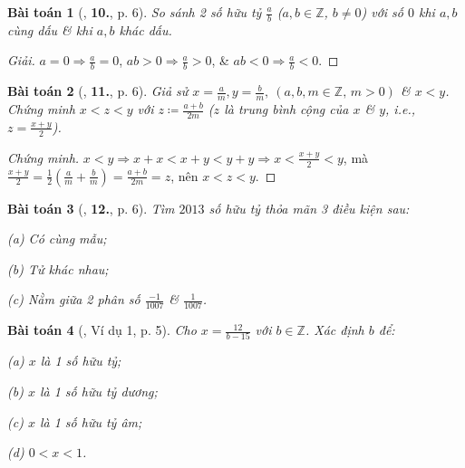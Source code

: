 \documentclass{article}
\numberwithin{equation}{section}
\newtheorem{baitoan}{Bài toán}[section]
\begin{document}
\begin{baitoan}[\cite{Trong_Toan_7_2022}, \textbf{10.}, p. 6]
	So sánh 2 số hữu tỷ $\frac{a}{b}$ ($a,b\in\mathbb{Z}$, $b\ne 0$) với số $0$ khi $a,b$ cùng dấu \& khi $a,b$ khác dấu.
\end{baitoan}

\begin{proof}[Giải]
	$a = 0\Rightarrow\frac{a}{b} = 0$, $ab > 0\Rightarrow\frac{a}{b} > 0$, \& $ab < 0\Rightarrow\frac{a}{b} < 0$.
\end{proof}

\begin{baitoan}[\cite{Trong_Toan_7_2022}, \textbf{11.}, p. 6]
	Giả sử $x = \frac{a}{m},y = \frac{b}{m},\ (a,b,m\in\mathbb{Z},\,m > 0)$ \& $x < y$. Chứng minh $x < z < y$ với $z\coloneqq\frac{a + b}{2m}$ ($z$ là \emph{trung bình cộng} của $x$ \& $y$, i.e., $z = \frac{x + y}{2}$).
\end{baitoan}

\begin{proof}[Chứng minh]
	$x < y\Rightarrow x + x < x + y < y + y\Rightarrow x < \frac{x + y}{2} < y$, mà $\frac{x + y}{2} = \frac{1}{2}\left(\frac{a}{m} + \frac{b}{m}\right) = \frac{a + b}{2m} = z$, nên $x < z < y$.
\end{proof}

\begin{baitoan}[\cite{Trong_Toan_7_2022}, \textbf{12.}, p. 6]
	Tìm $2013$ số hữu tỷ thỏa mãn 3 điều kiện sau:
	\begin{enumerate*}
		\item[(a)] Có cùng mẫu;
		\item[(b)] Tử khác nhau;
		\item[(c)] Nằm giữa 2 phân số $\frac{-1}{1007}$ \& $\frac{1}{1007}$.
	\end{enumerate*}
\end{baitoan}

\begin{baitoan}[\cite{Tuyen_Toan_7}, Ví dụ 1, p. 5]
	Cho $x = \frac{12}{b - 15}$ với $b\in\mathbb{Z}$. Xác định $b$ để:
	\begin{enumerate*}
		\item[(a)] $x$ là 1 số hữu tỷ;
		\item[(b)] $x$ là 1 số hữu tỷ dương;
		\item[(c)] $x$ là 1 số hữu tỷ âm;
		\item[(d)] $0 < x < 1$.
	\end{enumerate*}
\end{baitoan}
\end{document}
